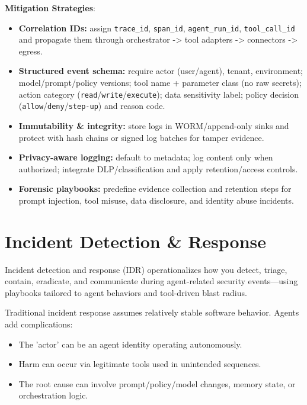 \begin{TNtwocol}
    \textbf{Mitigation Strategies}:
    \begin{itemize}
        \item \textbf{Correlation IDs:} assign \texttt{trace\_id}, \texttt{span\_id}, \texttt{agent\_run\_id}, \texttt{tool\_call\_id} and propagate them through orchestrator -> tool adapters -> connectors -> egress.
        \item \textbf{Structured event schema:} require actor (user/agent), tenant, environment; model/prompt/policy versions; tool name + parameter class (no raw secrets); action category (\texttt{read}/\texttt{write}/\texttt{execute}); data sensitivity label; policy decision (\texttt{allow}/\texttt{deny}/\texttt{step-up}) and reason code.
        \item \textbf{Immutability \& integrity:} store logs in WORM/append-only sinks and protect with hash chains or signed log batches for tamper evidence.
        \item \textbf{Privacy-aware logging:} default to metadata; log content only when authorized; integrate DLP/classification and apply retention/access controls.
        \item \textbf{Forensic playbooks:} predefine evidence collection and retention steps for prompt injection, tool misuse, data disclosure, and identity abuse incidents.
    \end{itemize}

    \section{Incident Detection & Response}

    Incident detection and response (IDR) operationalizes how you detect, triage, contain, eradicate, and communicate during agent-related security events—using playbooks tailored to agent behaviors and tool-driven blast radius.

    Traditional incident response assumes relatively stable software behavior. Agents add complications:

    \begin{itemize}
        \item The 'actor' can be an agent identity operating autonomously.
        \item Harm can occur via legitimate tools used in unintended sequences.
        \item The root cause can involve prompt/policy/model changes, memory state, or orchestration logic.
    \end{itemize}


\end{TNtwocol}
